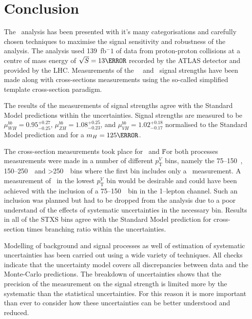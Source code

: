 \chapter{Conclusion}%
\label{ch:conclusion}
The \VHbb\ analysis has been presented with it's many categorisations and
carefully chosen techniques to maximise the signal sensitivity and robustness of
the analysis. The analysis used 139~fb$^-1$ of data from proton-proton
collisions at a centre of mass energy of $\sqrt{S} = 13 \TeV$ recorded by the
ATLAS detector and provided by the LHC. Measurements of the \WH\, \ZH\, and \VH\
signal strengths have been made along with cross-sections measurements using the
so-called simplified template cross-section paradigm. 

The results of the measurements of signal strengths agree with the Standard
Model predictions within the uncertainties. Signal strengths are measured to be
$\mu_{WH}^{bb} = 0.95^{+0.27}_{-0.25}$, $\mu_{ZH}^{bb} = 1.08^{+0.25}_{-0.23}$,
and $\mu_{VH}^{bb} = 1.02^{+0.18}_{-0.17}$ normalised to the Standard Model
prediction and for a $m_H = 125 \GeV$.

The cross-section measurements took place for \WH\ and \ZH\. For both processes
measurements were made in a number of different $p_{\mathrm{T}}^{V}$ bins,
namely the 75--150~\GeV, 150--250~\Gev\ and >250~\GeV\ bins where the first bin
includes only a \ZH\ measurement. A measurement of \WH\ in the lowest
$p_{\mathrm{T}}^{V}$ bin would be desirable and could have been achieved with
the inclusion of a 75--150~\GeV\ bin in the 1--lepton channel. Such an inclusion
was planned but had to be dropped from the analysis due to a poor understand of
the effects of systematic uncertainties in the necessary bin. Results in all of
the STXS bins agree with the Standard Model prediction for cross-section times
branching ratio within the uncertainties.

Modelling of background and signal processes as well of estimation of systematic
uncertainties has been carried out using a wide variety of techniques. All
checks indicate that the uncertainty model covers all discrepancies between data
and the Monte-Carlo predictions. The breakdown of uncertainties shows that the
precision of the measurement on the signal strength is limited more by the
systematic than the statistical uncertainties. For this reason it is more
important than ever to consider how these uncertainties can be better understood
and reduced. 

